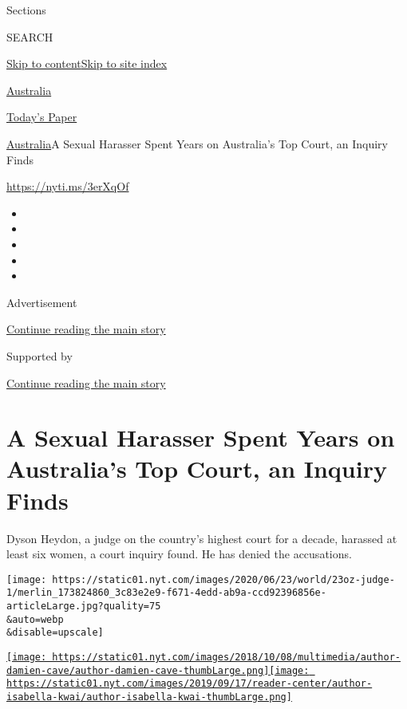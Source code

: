Sections

SEARCH

\protect\hyperlink{site-content}{Skip to
content}\protect\hyperlink{site-index}{Skip to site index}

\href{https://www.nytimes.com/section/world/australia}{Australia}

\href{https://myaccount.nytimes.com/auth/login?response_type=cookie\&client_id=vi}{}

\href{https://www.nytimes.com/section/todayspaper}{Today's Paper}

\href{/section/world/australia}{Australia}\textbar{}A Sexual Harasser
Spent Years on Australia's Top Court, an Inquiry Finds

\url{https://nyti.ms/3erXqOf}

\begin{itemize}
\item
\item
\item
\item
\item
\end{itemize}

Advertisement

\protect\hyperlink{after-top}{Continue reading the main story}

Supported by

\protect\hyperlink{after-sponsor}{Continue reading the main story}

\hypertarget{a-sexual-harasser-spent-years-on-australias-top-court-an-inquiry-finds}{%
\section{A Sexual Harasser Spent Years on Australia's Top Court, an
Inquiry
Finds}\label{a-sexual-harasser-spent-years-on-australias-top-court-an-inquiry-finds}}

Dyson Heydon, a judge on the country's highest court for a decade,
harassed at least six women, a court inquiry found. He has denied the
accusations.

\texttt{[image: https://static01.nyt.com/images/2020/06/23/world/23oz-judge-1/merlin\_173824860\_3c83e2e9-f671-4edd-ab9a-ccd92396856e-articleLarge.jpg?quality=75\\\&auto=webp\\\&disable=upscale]}

\href{https://www.nytimes.com/by/damien-cave}{\texttt{[image: https://static01.nyt.com/images/2018/10/08/multimedia/author-damien-cave/author-damien-cave-thumbLarge.png]}}\href{https://www.nytimes.com/by/isabella-kwai}{\texttt{[image: https://static01.nyt.com/images/2019/09/17/reader-center/author-isabella-kwai/author-isabella-kwai-thumbLarge.png]}}

